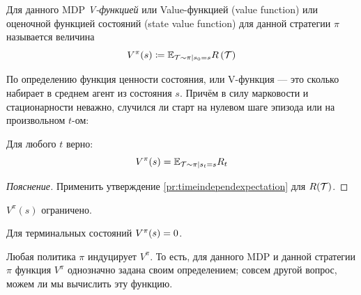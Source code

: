 \begin{definition} 
Для данного MDP \emph{V-функцией} или Value-функцией (value function) или оценочной функцией состояний (state value function) для данной стратегии $\pi$ называется величина 
\begin{equation}\label{Vdefinition}
V^\pi(s) \coloneqq \mathbb{E}_{\mathcal{T} \sim \pi \mid s_0 = s} R \left( \mathcal{T} \right)
\end{equation}
\end{definition}

По определению функция ценности состояния, или V-функция --- это сколько набирает в среднем агент из состояния $s$. Причём в силу марковости и стационарности неважно, случился ли старт на нулевом шаге эпизода или на произвольном $t$-ом:

\begin{proposition}\label{Vtimeindepend}
Для любого $t$ верно:
$$V^\pi(s) = \mathbb{E}_{\mathcal{T} \sim \pi \mid s_t = s} R_t$$
\begin{proof}[Пояснение] Применить утверждение \ref{pr:timeindependexpectation} для $R(\mathcal{T})$.
\end{proof}
\end{proposition}

\begin{proposition}
$V^\pi(s)$ ограничено.
\end{proposition}

\begin{proposition}
Для терминальных состояний $V^\pi(s) \HM= 0$.
\end{proposition}

\begin{remark}
Любая политика $\pi$ индуцирует $V^\pi$. То есть, для данного MDP и данной стратегии $\pi$ функция $V^\pi$ однозначно задана своим определением; совсем другой вопрос, можем ли мы вычислить эту функцию.
\end{remark}

